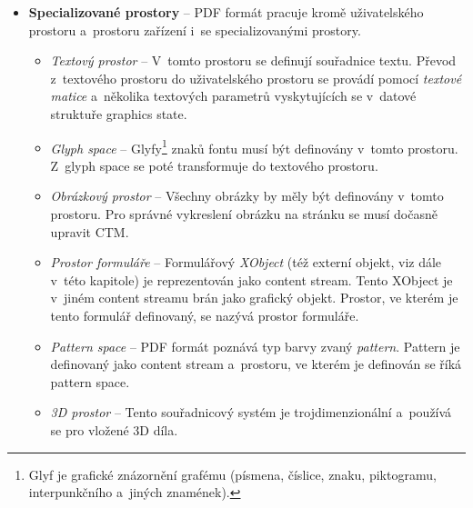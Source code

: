 \begin{itemize}
    \item \textbf{Specializované prostory} -- PDF formát pracuje kromě
    uživatelského prostoru a~prostoru zařízení i~se specializovanými prostory.
    \begin{itemize}
        \item \emph{Textový prostor} -- V~tomto prostoru se definují souřadnice
        textu. Převod z~textového prostoru do uživatelského prostoru se provádí
        pomocí \emph{textové matice} a~několika textových parametrů vyskytujících
        se v~datové struktuře graphics state.

        \item \emph{Glyph space} -- Glyfy\footnote{
            Glyf je grafické znázornění grafému (písmena, číslice, znaku, piktogramu, interpunkčního a~jiných znamének).
        }
        znaků fontu musí být definovány v~tomto
        prostoru. Z~glyph space se poté transformuje do textového prostoru.
        
        \item \emph{Obrázkový prostor} -- Všechny obrázky by měly být definovány
        v~tomto prostoru. Pro správné vykreslení obrázku na stránku se musí dočasně
        upravit CTM.

        \item \emph{Prostor formuláře} -- Formulářový \emph{XObject} (též externí
        objekt, viz dále v~této kapitole) je
        reprezentován jako content stream. Tento XObject je v~jiném content streamu
        brán jako grafický objekt. Prostor, ve kterém je tento formulář definovaný,
        se nazývá prostor formuláře.

        \item \emph{Pattern space} -- PDF formát poznává typ barvy zvaný
        \emph{pattern}. Pattern je definovaný jako content stream a~prostoru, ve
        kterém je definován se říká pattern space.
        
        \item \emph{3D prostor} -- Tento souřadnicový systém je
        trojdimenzionální a~používá se pro vložené 3D díla.
    \end{itemize}
\end{itemize}


